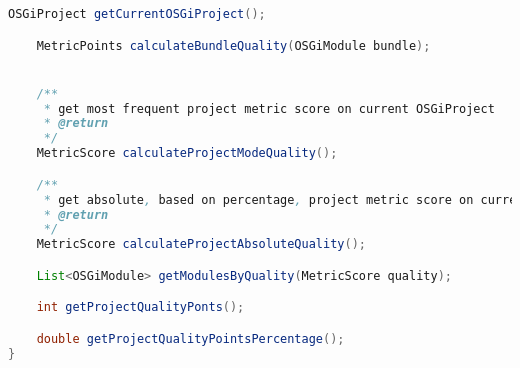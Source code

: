\begin{appendices}
\begin{lstlisting}[language=java, caption=Intrabundle MetricsCalculator interface]
    OSGiProject getCurrentOSGiProject();

    MetricPoints calculateBundleQuality(OSGiModule bundle);


    /**
     * get most frequent project metric score on current OSGiProject
     * @return
     */
    MetricScore calculateProjectModeQuality();

    /**
     * get absolute, based on percentage, project metric score on current OSGiProject
     * @return
     */
    MetricScore calculateProjectAbsoluteQuality();

    List<OSGiModule> getModulesByQuality(MetricScore quality);

    int getProjectQualityPonts();

    double getProjectQualityPointsPercentage();
}
\end{lstlisting}
\FloatBarrier


\end{appendices}
